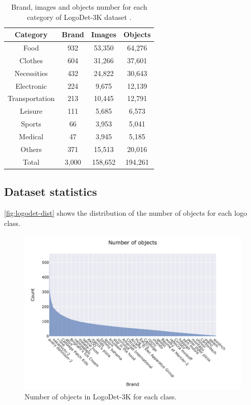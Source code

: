 \begin{table}
    \centering
    \begin{tabular}{c | c  c  c } 
     \hline
     \textbf{Category} & \textbf{Brand} & \textbf{Images} & \textbf{Objects} \\
     \hline
    Food & 932 & 53,350 & 64,276 \\ 
    Clothes & 604 & 31,266 & 37,601 \\ 
    Necessities & 432 & 24,822 & 30,643 \\ 
    Electronic & 224 & 9,675 & 12,139 \\ 
    Transportation & 213 & 10,445 & 12,791 \\ 
    Leisure & 111 & 5,685 & 6,573 \\ 
    Sports & 66 & 3,953 & 5,041 \\ 
    Medical & 47 & 3,945 & 5,185 \\ 
    Others & 371 & 15,513 & 20,016 \\ 
    \hline
    Total & 3,000 & 158,652 & 194,261 \\ 

    \end{tabular}
    \caption{Brand, images and objects number for each category of LogoDet-3K dataset \cite{wang2022logodet}.}
    \label{table:logodet3k-category-statistics}
\end{table}

\subsection{Dataset statistics}
\label{sec:dataset-stat}
\autoref{fig:logodet-dist} shows the distribution of the number of objects for each logo class.
\begin{figure}[ht]
	\centering

    \begin{center}
        \includegraphics[width=\columnwidth]{images/freq.jpeg}
    \end{center}
	\caption{Number of objects in LogoDet-3K for each class.}%
	\label{fig:logodet-dist}%
\end{figure}


